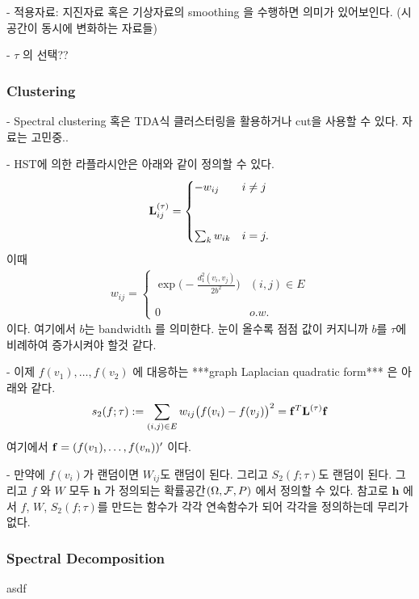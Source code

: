 \documentclass[preprint, review, 12pt]{article}
\theoremstyle{definition}
\theoremstyle{remark}
\begin{document}
- 적용자료: 지진자료 혹은 기상자료의 smoothing 을 수행하면 의미가 있어보인다. (시공간이 동시에 변화하는 자료들) 

- $\tau$ 의 선택??

\subsubsection*{Clustering}

- Spectral clustering 혹은 TDA식 클러스터링을 활용하거나 cut을 사용할 수 있다. 자료는 고민중.. 

- HST에 의한 라플라시안은 아래와 같이 정의할 수 있다. 
\begin{align}
{\bf L}_ {ij}^{(\tau)}=
\begin{cases} 
-w_{ij} & i\neq j \\\\ \\
\sum_k w_{ik} & i=j. 
\end{cases} 
\end{align} 
이때 
\begin{align}
w_{ij}=\begin{cases}
\exp \Big(-\frac{d_1^2(v_i,v_j)}{2b^2}\Big) & (i,j) \in E \\\\ \\
0 & o.w.
\end{cases}
\end{align}
이다. 여기에서 $b$는 bandwidth 를 의미한다. 눈이 올수록 점점 값이 커지니까 $b$를 $\tau$에 비례하여 증가시켜야 할것 같다. 

- 이제 $f(v_1),\dots,f(v_2)$ 에 대응하는 ***graph Laplacian quadratic form*** 은 아래와 같다. 
\begin{align}
s_2(f;\tau):=\sum_{(i,j)\in E} w_{ij} \big(f(v_i)-f(v_j)\big)^2={\bf f}^T {\bf L}^{(\tau)}{\bf f}
\end{align}
여기에서 ${\bf f}=(f(v_1),\dots,f(v_n))'$ 이다. 

- 만약에 $f(v_i)$가 랜덤이면 $W_{ij}$도 랜덤이 된다. 그리고 $S_2(f;\tau)$도 랜덤이 된다. 그리고 $f$ 와 $W$ 모두 ${\boldsymbol h}$ 가 정의되는 확률공간$(\Omega,{\cal F},P)$ 에서 정의할 수 있다. 참고로 ${\boldsymbol h}$ 에서 $f$, $W$, $S_2(f;\tau)$를 만드는 함수가 각각 연속함수가 되어 각각을 정의하는데 무리가 없다. 

\subsubsection*{Spectral Decomposition}
asdf
\end{document}
